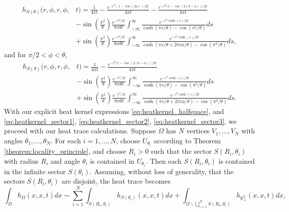 \documentclass{amsart}
\theoremstyle{definition}
\newcommand*{\R}{\mathbb{R}}
\begin{document}
\begin{equation} \label{eq:heatkernel_sector2}
    \begin{split}
        h_{S(\theta)}(r,\phi,r,\phi,&t) = \frac{1}{4\pi t} - \frac{e^{-r^2(1-\cos(2\phi))/2t}}{4\pi t} - \frac{e^{-r^2(1-\cos(2(\theta-\phi))/2t}}{4\pi t} \\
        &-\sin\left(\frac{\pi^2}{\theta}\right) \frac{e^{-r^2/2t}}{8\pi\theta t} \int_{-\infty}^\infty \frac{e^{-r^2\cosh(s)/2t}}{\cosh(\pi s/\theta) - \cos(\pi^2/\theta)} ds \\
        &+\sin\left(\frac{\pi^2}{\theta}\right) \frac{e^{-r^2/2t}}{8\pi\theta t} \int_{-\infty}^\infty \frac{e^{-r^2\cosh(s)/2t}}{\cosh(\pi s/\theta + 2\pi i\phi/\theta) - \cos(\pi^2/\theta)} ds,
    \end{split}
\end{equation}
and for $\pi/2 < \phi < \theta$,
\begin{equation} \label{eq:heatkernel_sector3}
    \begin{split}
        h_{S(\theta)}(r,\phi,r,\phi,&t) = \frac{1}{4\pi t} - \frac{e^{-r^2(1-\cos(2(\theta-\phi))/2t}}{4\pi t} \\
        &-\sin\left(\frac{\pi^2}{\theta}\right) \frac{e^{-r^2/2t}}{8\pi\theta t} \int_{-\infty}^\infty \frac{e^{-r^2\cosh(s)/2t}}{\cosh(\pi s/\theta) - \cos(\pi^2/\theta)} ds \\
        &+\sin\left(\frac{\pi^2}{\theta}\right) \frac{e^{-r^2/2t}}{8\pi\theta t} \int_{-\infty}^\infty \frac{e^{-r^2\cosh(s)/2t}}{\cosh(\pi s/\theta + 2\pi i\phi/\theta) - \cos(\pi^2/\theta)} ds.
    \end{split}
\end{equation}
With our explicit heat kernel expressions \eqref{eq:heatkernel_halfspace}, and \eqref{eq:heatkernel_sector1}, \eqref{eq:heatkernel_sector2}, \eqref{eq:heatkernel_sector3}, we proceed with our heat trace calculations.  
Suppose $\Omega$ has $N$ vertices $V_1,\dots,V_N$ 
with angles $\theta_1,\dots,\theta_N$. For each $i = 1,\dots,N$, choose $U_{\theta_i}$ according to Theorem \ref{theorem:locality_principle}, and choose $R_i > 0$ such that the sector $S(R_i, \theta_i)$ with radius $R_i$ and angle $\theta_i$ is contained in $U_{\theta_i}$. Then each $S(R_i, \theta_i)$ is contained in the infinite sector $S(\theta_i)$. Assuming, without loss of generality, that the sectors $S(R_i, \theta_i)$ are disjoint, the heat trace becomes
\begin{equation*}
    \int_\Omega h_\Omega(x,x,t) dx \sim \sum_{i = 1}^N \int_{S(R_i, \theta_i)} h_{S(\theta_i)}(x,x,t) dx + \int_{\Omega \backslash \bigcup_{i=1}^N S(R_i, \theta_i)} h_{\R_+^2}(x,x,t) dx, 
\end{equation*}
\end{document}
